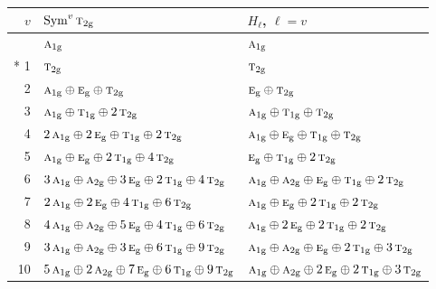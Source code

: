 \documentclass[10pt,a4paper]{article}
\numberwithin{equation}{section}
\newcommand{\irr}[1]{\text{\normalfont\scshape #1}}
\newcommand{\ptag}[1]{\mathrm{#1}}
\begin{document}
{\small\begin{longtable}{@{}rll@{}}\toprule
$v$ & $\operatorname{Sym}^{v}\irr{t}_{2\ptag{g}}$ & $H_\ell$, $\ell = v$\\\midrule\endhead
\bottomrule\endfoot\endlastfoot
0 & $\irr{a}_{1\ptag{g}}$ & $\irr{a}_{1\ptag{g}}$\\*
1 & $\irr{t}_{2\ptag{g}}$ & $\irr{t}_{2\ptag{g}}$\\
2 & $\irr{a}_{1\ptag{g}} \oplus \irr{e}_{\ptag{g}} \oplus \irr{t}_{2\ptag{g}}$ & $\irr{e}_{\ptag{g}} \oplus \irr{t}_{2\ptag{g}}$\\
3 & $\irr{a}_{1\ptag{g}} \oplus \irr{t}_{1\ptag{g}} \oplus 2\,\irr{t}_{2\ptag{g}}$ & $\irr{a}_{1\ptag{g}} \oplus \irr{t}_{1\ptag{g}} \oplus \irr{t}_{2\ptag{g}}$\\
4 & $2\,\irr{a}_{1\ptag{g}} \oplus 2\,\irr{e}_{\ptag{g}} \oplus \irr{t}_{1\ptag{g}} \oplus 2\,\irr{t}_{2\ptag{g}}$ & $\irr{a}_{1\ptag{g}} \oplus \irr{e}_{\ptag{g}} \oplus \irr{t}_{1\ptag{g}} \oplus \irr{t}_{2\ptag{g}}$\\
5 & $\irr{a}_{1\ptag{g}} \oplus \irr{e}_{\ptag{g}} \oplus 2\,\irr{t}_{1\ptag{g}} \oplus 4\,\irr{t}_{2\ptag{g}}$ & $\irr{e}_{\ptag{g}} \oplus \irr{t}_{1\ptag{g}} \oplus 2\,\irr{t}_{2\ptag{g}}$\\
6 & $3\,\irr{a}_{1\ptag{g}} \oplus \irr{a}_{2\ptag{g}} \oplus 3\,\irr{e}_{\ptag{g}} \oplus 2\,\irr{t}_{1\ptag{g}} \oplus 4\,\irr{t}_{2\ptag{g}}$ & $\irr{a}_{1\ptag{g}} \oplus \irr{a}_{2\ptag{g}} \oplus \irr{e}_{\ptag{g}} \oplus \irr{t}_{1\ptag{g}} \oplus 2\,\irr{t}_{2\ptag{g}}$\\
7 & $2\,\irr{a}_{1\ptag{g}} \oplus 2\,\irr{e}_{\ptag{g}} \oplus 4\,\irr{t}_{1\ptag{g}} \oplus 6\,\irr{t}_{2\ptag{g}}$ & $\irr{a}_{1\ptag{g}} \oplus \irr{e}_{\ptag{g}} \oplus 2\,\irr{t}_{1\ptag{g}} \oplus 2\,\irr{t}_{2\ptag{g}}$\\
8 & $4\,\irr{a}_{1\ptag{g}} \oplus \irr{a}_{2\ptag{g}} \oplus 5\,\irr{e}_{\ptag{g}} \oplus 4\,\irr{t}_{1\ptag{g}} \oplus 6\,\irr{t}_{2\ptag{g}}$ & $\irr{a}_{1\ptag{g}} \oplus 2\,\irr{e}_{\ptag{g}} \oplus 2\,\irr{t}_{1\ptag{g}} \oplus 2\,\irr{t}_{2\ptag{g}}$\\
9 & $3\,\irr{a}_{1\ptag{g}} \oplus \irr{a}_{2\ptag{g}} \oplus 3\,\irr{e}_{\ptag{g}} \oplus 6\,\irr{t}_{1\ptag{g}} \oplus 9\,\irr{t}_{2\ptag{g}}$ & $\irr{a}_{1\ptag{g}} \oplus \irr{a}_{2\ptag{g}} \oplus \irr{e}_{\ptag{g}} \oplus 2\,\irr{t}_{1\ptag{g}} \oplus 3\,\irr{t}_{2\ptag{g}}$\\
10 & $5\,\irr{a}_{1\ptag{g}} \oplus 2\,\irr{a}_{2\ptag{g}} \oplus 7\,\irr{e}_{\ptag{g}} \oplus 6\,\irr{t}_{1\ptag{g}} \oplus 9\,\irr{t}_{2\ptag{g}}$ & $\irr{a}_{1\ptag{g}} \oplus \irr{a}_{2\ptag{g}} \oplus 2\,\irr{e}_{\ptag{g}} \oplus 2\,\irr{t}_{1\ptag{g}} \oplus 3\,\irr{t}_{2\ptag{g}}$\\

\end{longtable}}
\end{document}
